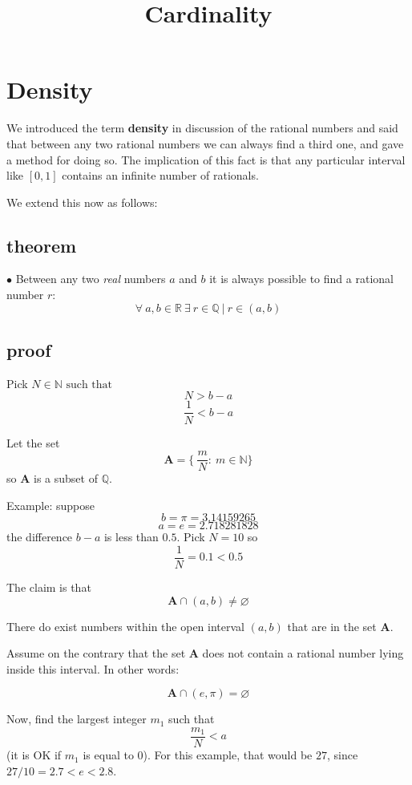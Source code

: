 \documentclass[11pt, oneside]{article}
\title{Cardinality}
\date{}
\begin{document}
\maketitle
\Large

\section{Density}

We introduced the term \textbf{density} in discussion of the rational numbers and said that between any two rational numbers we can always find a third one, and gave a method for doing so.  The implication of this fact is that any particular interval like $[0,1]$ contains an infinite number of rationals.

We extend this now as follows:

\subsection*{theorem}

$\bullet$  Between any two \emph{real} numbers $a$ and $b$ it is always possible to find a rational number $r$:  
\[ \forall \ a,b \in \mathbb{R} \ \exists \ r \in \mathbb{Q} \ | \ r \in (a,b) \]

\subsection*{proof}

Pick $N \in \mathbb{N} \text{ such that }$
\[ N > b - a \]
\[ \frac{1}{N} < b - a \]

Let the set 
\[ \mathbf{A} = \{ \ \frac{m}{N}: \ m \in \mathbb{N} \} \]
so $\mathbf{A}$ is a subset of $\mathbb{Q}$.

Example:  suppose
\[ b = \pi = 3.14159265 \]
\[ a = e = 2.718281828 \]
the difference $b-a$ is less than $0.5$.  Pick $N = 10$ so
\[ \frac{1}{N} = 0.1 < 0.5 \]

The claim is that
\[ \mathbf{A} \cap (a,b) \ne \varnothing \]

There do exist numbers within the open interval $(a,b)$ that are in the set $\mathbf{A}$.

Assume on the contrary that the set $\mathbf{A}$ does not contain a rational number lying inside this interval.  In other words:

\[ \mathbf{A} \cap (e,\pi) = \varnothing \]

Now, find the largest integer $m_1$ such that 
\[ \frac{m_1}{N} < a \]
(it is OK if $m_1$ is equal to $0$).  For this example, that would be $27$, since $27/10 = 2.7 < e < 2.8$.
\end{document}
